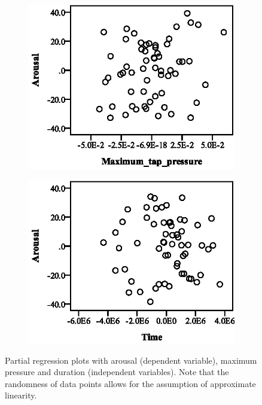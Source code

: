 \begin{figure}[ht]
  \centering
  \begin{subfigure}[b]{0.45\textwidth}
    \centering
    \includegraphics[width=\textwidth]{images/linearity/partialregression/arousal/ArMaxMax.eps}
    \label{fig:armaxmax}
  \end{subfigure}
  \quad
  \begin{subfigure}[b]{0.45\textwidth}
    \centering
    \includegraphics[width=\textwidth]{images/linearity/partialregression/arousal/ArMaxTime.eps}
    \label{fig:armaxtime}
  \end{subfigure}
  \caption{Partial regression plots with arousal (dependent variable), maximum pressure and duration (independent variables). Note that the randomness of data points allows for the assumption of approximate linearity.}
\end{figure}

